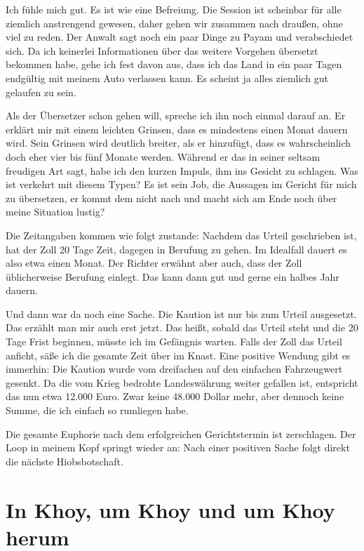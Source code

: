Ich fühle mich gut. Es ist wie eine Befreiung. Die Session ist scheinbar für alle ziemlich anstrengend gewesen, daher gehen wir zusammen nach draußen, ohne viel zu reden. Der Anwalt sagt noch ein paar Dinge zu Payam und verabschiedet sich. Da ich keinerlei Informationen über das weitere Vorgehen übersetzt bekommen habe, gehe ich fest davon aus, dass ich das Land in ein paar Tagen endgültig mit meinem Auto verlassen kann. Es scheint ja alles ziemlich gut gelaufen zu sein.

Als der Übersetzer schon gehen will, spreche ich ihn noch einmal darauf an. Er erklärt mir mit einem leichten Grinsen, dass es mindestens einen Monat dauern wird. Sein Grinsen wird deutlich breiter, als er hinzufügt, dass es wahrscheinlich doch eher vier bis fünf Monate werden. Während er das in seiner seltsam freudigen Art sagt, habe ich den kurzen Impuls, ihm ins Gesicht zu schlagen. Was ist verkehrt mit diesem Typen? Es ist sein Job, die Aussagen im Gericht für mich zu übersetzen, er kommt dem nicht nach und macht sich am Ende noch über meine Situation lustig?

Die Zeitangaben kommen wie folgt zustande: Nachdem das Urteil geschrieben ist, hat der Zoll 20 Tage Zeit, dagegen in Berufung zu gehen. Im Idealfall dauert es also etwa einen Monat. Der Richter erwähnt aber auch, dass der Zoll üblicherweise Berufung einlegt. Das kann dann gut und gerne ein halbes Jahr dauern.

Und dann war da noch eine Sache. Die Kaution ist nur bis zum Urteil ausgesetzt. Das erzählt man mir auch erst jetzt. Das heißt, sobald das Urteil steht und die 20 Tage Frist beginnen, müsste ich im Gefängnis warten. Falls der Zoll das Urteil anficht, säße ich die gesamte Zeit über im Knast. Eine positive Wendung gibt es immerhin: Die Kaution wurde vom dreifachen auf den einfachen Fahrzeugwert gesenkt. Da die vom Krieg bedrohte Landeswährung weiter gefallen ist, entspricht das nun etwa 12.000 Euro. Zwar keine 48.000 Dollar mehr, aber dennoch keine Summe, die ich einfach so rumliegen habe.

Die gesamte Euphorie nach dem erfolgreichen Gerichtstermin ist zerschlagen. Der Loop in meinem Kopf springt wieder an: Nach einer positiven Sache folgt direkt die nächste Hiobsbotschaft.

\chapter*{In Khoy, um Khoy und um Khoy herum}

